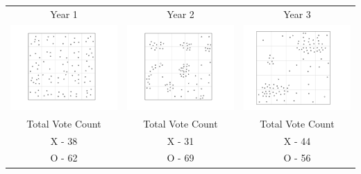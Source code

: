 \begin{tabular}{c c c }

Year 1 & Year 2 & Year 3 \\
 \includegraphics[width=2in]{assets/Gerrymandering/Gerry5x5-100-1.pdf} &  \includegraphics[width=2in]{assets/Gerrymandering/Gerry5x5-100-2.pdf} &  \includegraphics[width=2in]{assets/Gerrymandering/Gerry5x5-100-3.pdf}\\
 Total Vote Count &  Total Vote Count &  Total Vote Count\\
 X -  38& X - 31 & X  - 44\\
 O - 62 & O - 69 & O - 56
 \end{tabular}